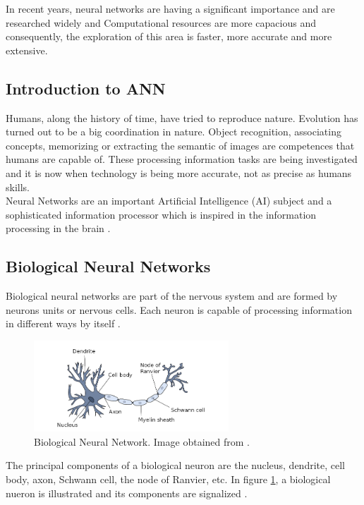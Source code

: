 In recent years, neural networks are having a significant importance and are researched widely and Computational resources are more capacious and consequently, the exploration of this area is faster, more accurate and more extensive.\\

\subsection{Introduction to ANN}
Humans, along the history of time, have tried to reproduce nature. Evolution has turned out to be a big coordination in nature. Object recognition, associating concepts, memorizing or extracting the semantic of images are competences that humans are capable of. These processing information tasks are being investigated and it is now when technology is being more accurate, not as precise as humans skills.\\

Neural Networks are an important Artificial Intelligence (AI) subject and a sophisticated information processor which is inspired in the information processing in the brain \cite{Rojas}.\\

\subsection{Biological Neural Networks}
Biological neural networks are part of the nervous system and are formed by neurons units or nervous cells. Each neuron is capable of processing information in different ways by itself \cite{Rojas}.\\

\begin{figure}[htb]
\centering
\includegraphics[width=0.65\textwidth]{images_miscelaneus/neuron.png}
\caption{Biological Neural Network. Image obtained from \cite{BINN}.} \label{fig:Bio-Neuron}
\end{figure}

The principal components of a biological neuron are the nucleus, dendrite, cell body, axon, Schwann cell, the node of Ranvier, etc. In figure \ref{fig:Bio-Neuron}, a biological nueron is illustrated and its components are signalized \cite{BINN}.\\

